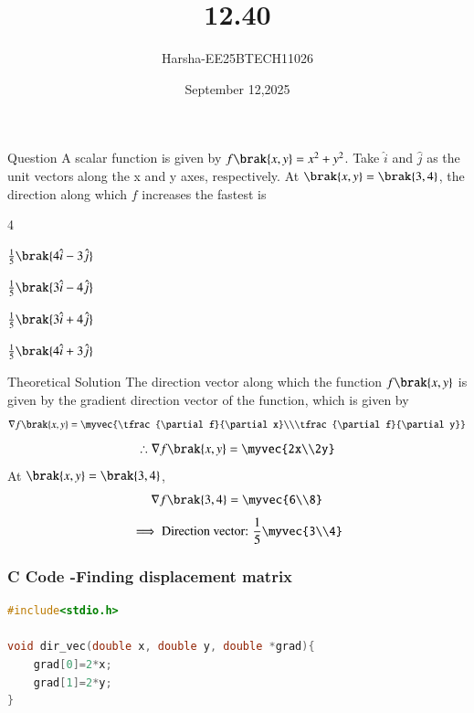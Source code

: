 \documentclass{beamer}
\title %
{12.40}
\date{September 12,2025}
\author %
{Harsha-EE25BTECH11026}
\begin{document}
\frame{\titlepage}


\begin{frame}{Question}
A scalar function is given by $f\brak{x,y}=x^2+y^2$. Take $\hat{i}$ and $\hat{j}$ as the unit vectors along the x and y axes, respectively. At $\brak{x,y}=\brak{3,4}$, the direction along which $f$ increases the fastest is
\begin{enumerate}
\begin{multicols}{4}
    \item $\frac{1}{5}\brak{4\hat{i}-3\hat{j}}$
    \item $\frac{1}{5}\brak{3\hat{i}-4\hat{j}}$
    \item $\frac{1}{5}\brak{3\hat{i}+4\hat{j}}$
    \item $\frac{1}{5}\brak{4\hat{i}+3\hat{j}}$
\end{multicols}
\end{enumerate}
\end{frame}

\begin{frame}{Theoretical Solution}
The direction vector along which the function $f\brak{x,y}$ is given by the gradient direction vector of the function, which is given by
\begin{align}
    \nabla f\brak{x,y}=\myvec{\tfrac{\partial f}{\partial x}\\\tfrac{\partial f}{\partial y}}
\end{align}
\begin{align}
    \therefore \nabla f\brak{x,y}=\myvec{2x\\2y}
\end{align}
At $\brak{x,y}=\brak{3,4}$,
\begin{align}
    \nabla f\brak{3,4}=\myvec{6\\8}
\end{align}
\begin{align}
    \implies \text{Direction vector: }\frac{1}{5}\myvec{3\\4}
\end{align}
\end{frame}


\begin{frame}[fragile]
    \frametitle{C Code -Finding displacement matrix}

    \begin{lstlisting}[language=C]
#include<stdio.h>

void dir_vec(double x, double y, double *grad){
	grad[0]=2*x;
	grad[1]=2*y;
}
    \end{lstlisting}
\end{frame}
\end{document}
